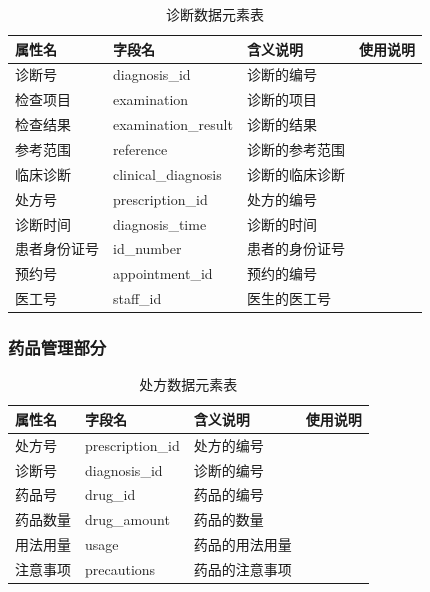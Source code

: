 \documentclass{article}
\begin{document}
\begin{table}[H]
    \centering
    \begin{tabularx}{\textwidth}{|p{2.2cm}|p{3.3cm}|p{4.7cm}|p{5cm}|}
    \toprule
    \textbf{属性名} & \textbf{字段名} & \textbf{含义说明} & \textbf{使用说明} \\ \midrule
    诊断号 & diagnosis\_id & 诊断的编号 &  \\ \midrule
    检查项目 & examination & 诊断的项目 &  \\ \midrule
    检查结果 & examination\_result & 诊断的结果 &  \\ \midrule
    参考范围 & reference & 诊断的参考范围 &  \\ \midrule
    临床诊断 & clinical\_diagnosis & 诊断的临床诊断 &  \\ \midrule
    处方号 & prescription\_id & 处方的编号 &  \\ \midrule
    诊断时间 & diagnosis\_time & 诊断的时间 &  \\ \midrule
    患者身份证号 & id\_number & 患者的身份证号 &  \\ \midrule
    预约号 & appointment\_id & 预约的编号 &  \\ \midrule
    医工号 & staff\_id & 医生的医工号 &  \\ \bottomrule
    \end{tabularx}
    \caption{诊断数据元素表}
    \label{tab:diagnosis_elements}
\end{table}

\subsubsection{药品管理部分}

\begin{table}[H]
    \centering
    \begin{tabularx}{\textwidth}{|p{2.2cm}|p{3.3cm}|p{4.7cm}|p{5cm}|}
    \toprule
    \textbf{属性名} & \textbf{字段名} & \textbf{含义说明} & \textbf{使用说明} \\ \midrule
    处方号 & prescription\_id & 处方的编号 &  \\ \midrule
    诊断号 & diagnosis\_id & 诊断的编号 &  \\ \midrule
    药品号 & drug\_id & 药品的编号 &  \\ \midrule
    药品数量 & drug\_amount & 药品的数量 &  \\ \midrule
    用法用量 & usage & 药品的用法用量 &  \\ \midrule
    注意事项 & precautions & 药品的注意事项 &  \\ \bottomrule
    \end{tabularx}
    \caption{处方数据元素表}
    \label{tab:prescription_elements}
\end{table}
\end{document}
